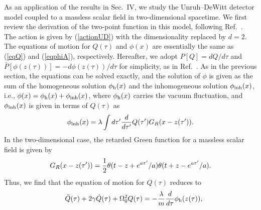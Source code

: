 \documentclass[aps,prd,preprintnumbers,nofootinbib,showpacs,11pt]{revtex4}%
\begin{document}
\begin{widetext}
As an application of the results in Sec.~IV, we study 
the Unruh--DeWitt detector model coupled to a massless scalar field in two-dimensional spacetime. 
We first review the derivation of the two-point function in this model, following Ref.~\cite{HuRaval}. 
The action is given by (\ref{actionUD}) with the dimensionality replaced by $d=2.$
The equations of motion for $Q(\tau)$ and $\phi(x)$ are essentially the same as 
(\ref{eqQ}) and (\ref{eqphiA}), respectively. 
Hereafter, we adopt $P[Q]={dQ/d\tau}$ and $\bar P[\phi(z(\tau))]=-{d\phi(z(\tau))/d\tau}$
for simplicity, as in Ref.~\cite{HuRaval}.
As in the previous section, the equations can be solved exactly, and 
the solution of $\phi$ is given as the sum of the homogeneous solution $\phi_{\rm h}(x)$ and the 
inhomogeneous solution $\phi_{\rm inh}(x)$, i.e.,
$  \phi(x)=\phi_{\rm h}(x)+\phi_{\rm inh}(x)$,
where $\phi_{\rm h}(x)$ carries the vacuum fluctuation, and $\phi_{\rm inh}(x)$ is given 
in terms of $Q(\tau)$ as
\begin{eqnarray}
\phi_{\rm inh}(x) =\lambda \int d\tau' {d\over d\tau'}Q(\tau')G_R(x-z(\tau')).
\label{phiQG2}
\end{eqnarray}
In the two-dimensional case, the retarded Green function for a massless scalar field is given by
\begin{eqnarray}
G_R(x-z(\tau'))={1\over 2}\theta(t-z+e^{a\tau'}/a)\theta(t+z-e^{a\tau'}/a).
\label{RGF2}
\end{eqnarray}
Thus, we find that the equation of motion for $Q(\tau)$ reduces to 
\begin{eqnarray}
&&\ddot Q(\tau)+2\gamma\dot Q(\tau)+\Omega_0^2Q(\tau)
=-{\lambda\over m}{d\over d\tau}\phi_{\rm h}(z(\tau)),
\label{eqQ2b}
\end{eqnarray}

\end{widetext}
\end{document}
